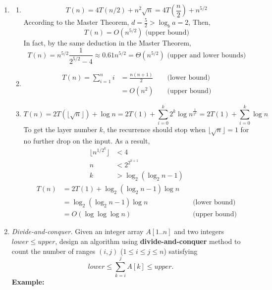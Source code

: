 \documentclass[12pt,a4paper]{article}
\makeatletter
\newtheorem*{solution}{Solution}
\theoremstyle{definition}
\renewenvironment{solution}[1][Solution] {\par\pushQED{\qed}\normalfont\topsep6\p@\@plus6\p@\relax\trivlist\item[\hskip\labelsep\bfseries#1\@addpunct{.}]\ignorespaces}{\popQED\endtrivlist\@endpefalse} \makeatother
\makeatother
\begin{document}
\begin{enumerate}
\begin{solution}
\begin{enumerate}
        \item \begin{equation*}
            T(n) = 4 T(n / 2)+n^{2} \sqrt{n} = 4T\left(\frac{n}{2}\right) + n^{5/2}
        \end{equation*}
        According to the Master Theorem, $d=\frac{5}{2} > \log_b a = 2$, Then,
        \begin{equation*}
            T(n) = O(n^{5/2}) \text{ (upper bound)}
        \end{equation*}
        In fact, by the same deduction in the Master Theorem,
        \begin{equation*}
            T(n) = n^{5/2}\frac{1}{2^{5/2}-4} \approx 0.61 n^{5/2} = \Theta(n^{5/2}) \text{ (upper and lower bounds)}
        \end{equation*}
        \item \begin{align*}
            T(n) = \sum_{i=1}^n i &= \frac{n(n+1)}{2}&&\text{ (lower bound)}\\
            &= O(n^2)&&\text{ (upper bound)}
        \end{align*}
       
        \item \begin{equation*}
            T(n)=2T(\lfloor \sqrt n\rfloor)+\log n = 2T(1) + \sum_{i=0}^k 2^k \log n^{\frac{1}{2^k}} = 2T(1) + \sum_{i=0}^k \log n
        \end{equation*}
        To get the layer number $k$, the recurrence should stop when $\lfloor \sqrt n\rfloor=1$ for no further drop on the input. As a result,
        \begin{align*}
           \lfloor n^{1/2^{k}}\rfloor &< 4 \\
           n&< 2^{2^{k+1}}\\
           k&> \log_2 (\log_2 n - 1)
        \end{align*}
        \begin{align*}
            T(n)&=2T(1)+\log_2 (\log_2 n - 1)\log n\\
            &=\log_2 (\log_2 n - 1)\log n&&\text{ (lower bound)} \\
            &= O(\log\log\log n)&&\text{ (upper bound)}
        \end{align*} %
    \end{enumerate}
    
\end{solution}
\item
\textit{Divide-and-conquer.} Given an integer array $A[1..n]$ and two integers $lower \le upper$, design an algorithm using \textbf{divide-and-conquer} method to count the number of ranges $(i,j)$ ($1 \leq i \leq j \leq n$) satisfying
$$
    lower \leq \sum_{k=i}^{j}{A[k]} \leq upper.
$$
\textbf{Example:}


\end{enumerate}
\end{document}
